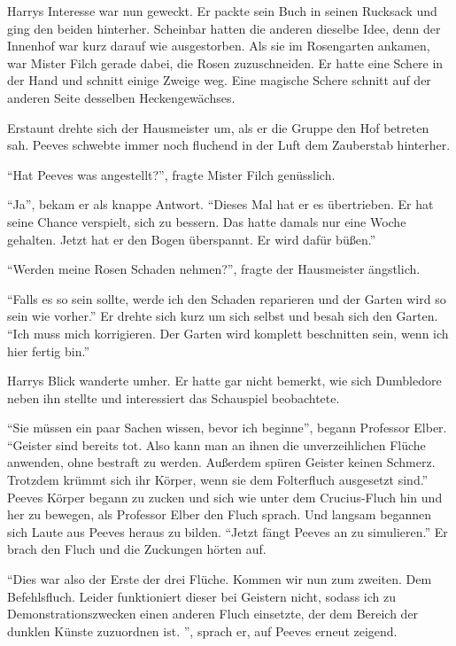 Harrys Interesse war nun geweckt. Er packte sein Buch in seinen Rucksack und ging den beiden hinterher. Scheinbar hatten die anderen dieselbe Idee, denn der Innenhof war kurz darauf wie ausgestorben. Als sie im Rosengarten ankamen, war Mister Filch gerade dabei, die Rosen zuzuschneiden. Er hatte eine Schere in der Hand und schnitt einige Zweige weg. Eine magische Schere schnitt auf der anderen Seite desselben Heckengewächses.

Erstaunt drehte sich der Hausmeister um, als er die Gruppe den Hof betreten sah. Peeves schwebte immer noch fluchend in der Luft dem Zauberstab hinterher.

\enquote{Hat Peeves was angestellt?}, fragte Mister Filch genüsslich.

\enquote{Ja}, bekam er als knappe Antwort. \enquote{Dieses Mal hat er es übertrieben. Er hat seine Chance verspielt, sich zu bessern. Das hatte damals nur eine Woche gehalten. Jetzt hat er den Bogen überspannt. Er wird dafür büßen.}

\enquote{Werden meine Rosen Schaden nehmen?}, fragte der Hausmeister ängstlich.

\enquote{Falls es so sein sollte, werde ich den Schaden reparieren und der Garten wird so sein wie vorher.} Er drehte sich kurz um sich selbst und besah sich den Garten. \enquote{Ich muss mich korrigieren. Der Garten wird komplett beschnitten sein, wenn ich hier fertig bin.}

Harrys Blick wanderte umher. Er hatte gar nicht bemerkt, wie sich Dumbledore neben ihn stellte und interessiert das Schauspiel beobachtete.

\enquote{Sie müssen ein paar Sachen wissen, bevor ich beginne}, begann Professor Elber. \enquote{Geister sind bereits tot. Also kann man an ihnen die unverzeihlichen Flüche anwenden, ohne bestraft zu werden. Außerdem spüren Geister keinen Schmerz. Trotzdem krümmt sich ihr Körper, wenn sie \gst {} \gst dem Folterfluch ausgesetzt sind.} Peeves Körper begann zu zucken und sich wie unter dem Crucius-Fluch hin und her zu bewegen, als Professor Elber den Fluch sprach. Und langsam begannen sich Laute aus Peeves heraus zu bilden. \enquote{Jetzt fängt Peeves an zu simulieren.} Er brach den Fluch und die Zuckungen hörten auf.

\enquote{Dies war also der Erste der drei Flüche. Kommen wir nun zum zweiten. Dem Befehlsfluch. Leider funktioniert dieser bei Geistern nicht, sodass ich zu Demonstrationszwecken einen anderen Fluch einsetzte, der dem Bereich der dunklen Künste zuzuordnen ist. }, sprach er, auf Peeves erneut zeigend.

